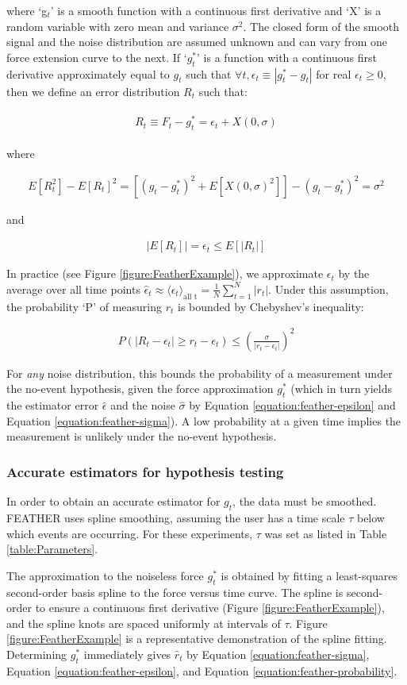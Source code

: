 \documentclass[%
  aip,12pt,tightenlines,
  amsthm,
 amsmath,amssymb
]{article}
\newcommand{\eqs}[1]{
\begin{align*} 
\begin{split}
#1
\end{split}					
\end{align*}}
\newcommand{\eqlab}[2]{
\begin{equation}
\label{equation:#2}
\begin{split}
#1
\end{split}
\end{equation}
}
\newcommand{\tRef}[1]{Table \ref{table:#1}}
\newcommand{\fRef}[1]{Figure \ref{figure:#1}}
\newcommand{\eRef}[1]{Equation \ref{equation:#1}}
\newcommand{\firstp}[0]{}
\newcommand{\pl}[0]{\vspace{6pt}}
\newcommand{\name}[0]{FEATHER}
\newcommand{\citePRH}[1]{\cite{#1}}
\begin{document}
where `g$_t$' is a smooth function with a continuous first derivative and `X' is a random variable with zero mean and variance $\sigma^2$. The closed form of the smooth signal and the noise distribution are assumed unknown and can vary from one force extension curve to the next. If `$g^{*}_t$' is a function with a continuous first derivative approximately equal to $g_t$ such that $\forall t,\epsilon_t\equiv|g^{*}_t-g_t|$ for real $\epsilon_t\ge 0$, then we define an error distribution $R_t$ such that: \pl

\eqs{ R_t \equiv F_t - g^{*}_t = \epsilon_t + X(0,\sigma) }

where

\eqlab{ E[R_t^2] -E[R_t]^2 = [(g_t-g^{*}_t)^2 + E[X(0,\sigma)^2]] - (g_t-g^{*}_t)^2  = \sigma^2 }{feather-sigma}

and 

\eqlab{ |E[R_t]| = \epsilon_t \le E[|R_t|] }{feather-epsilon}

In practice (see \fRef{FeatherExample}), we approximate $\epsilon_t$ by the average over all time points $\hat{\epsilon}_t \approx \langle \epsilon_t \rangle_{\text{all t}} = \frac{1}{N} \sum_{t=1}^N |r_t|$. Under this assumption, the probability `P' of measuring $r_t$ is bounded by Chebyshev's inequality:

\eqlab{ \boxed{P( |R_t-\epsilon_t| \ge r_t-\epsilon_t ) \le
 (\frac{\sigma}{|r_t-\epsilon_t|})^2 }}{feather-probability}


For \emph{any} noise distribution, this bounds the probability of a measurement under the no-event hypothesis, given the force approximation $g^{*}_t$ (which in turn yields the estimator error $\hat{\epsilon}$ and the noise $\hat{\sigma}$ by \eRef{feather-epsilon} and \eRef{feather-sigma}). A low probability at a given time implies the measurement is unlikely under the no-event hypothesis. \pl

\subsubsection{Accurate estimators for hypothesis testing}

\firstp In order to obtain an accurate estimator for $g_t$, the data must be smoothed. \name{} uses spline smoothing, assuming the user has a time scale $\tau$ below which events are occurring. For these experiments, $\tau$ was set as listed in \tRef{Parameters}. \pl 

The approximation to the noiseless force $g^{*}_t$ is obtained by fitting a least-squares second-order basis spline\citePRH{dierckx_algorithm_1975} to the force versus time curve. The spline is second-order to ensure a continuous first derivative (\fRef{FeatherExample}), and the spline knots are spaced uniformly at intervals of $\tau$. \fRef{FeatherExample} is a representative demonstration of the spline fitting. Determining  $g^{*}_t$ immediately gives $\hat{r}_t$ by  \eRef{feather-sigma}, \eRef{feather-epsilon}, and \eRef{feather-probability}. \pl
\end{document}
